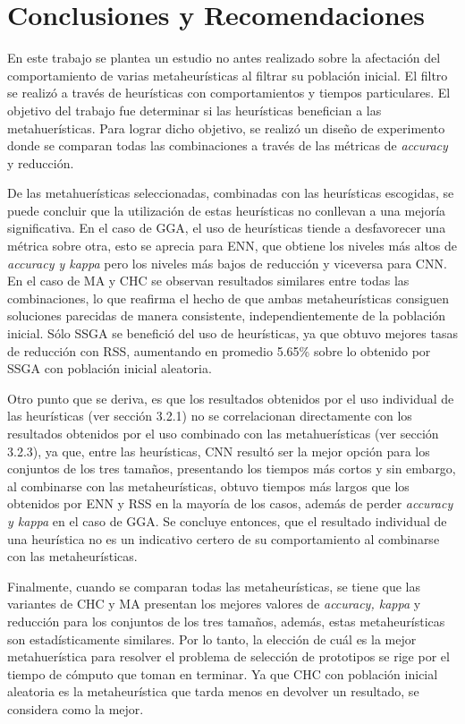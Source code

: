 \chapter*{Conclusiones y Recomendaciones}
\label{conclusiones}

En este trabajo se plantea un estudio no antes realizado sobre la afectación del comportamiento de varias metaheurísticas al filtrar su población inicial. El filtro se realizó a través de heurísticas con comportamientos y tiempos particulares. El objetivo del trabajo fue determinar si las heurísticas benefician a las metahuerísticas. Para lograr dicho objetivo, se realizó un diseño de experimento donde se comparan todas las combinaciones a través de las métricas de \emph{accuracy} y reducción.


De las metahuerísticas seleccionadas, combinadas con las heurísticas escogidas, se puede concluir que la utilización de estas heurísticas no conllevan a una mejoría significativa. En el caso de GGA, el uso de heurísticas tiende a desfavorecer una métrica sobre otra, esto se aprecia para ENN, que obtiene los niveles más altos de \emph{accuracy y kappa} pero los niveles más bajos de reducción y viceversa para CNN. En el caso de MA y CHC se observan resultados similares entre todas las combinaciones, lo que reafirma el hecho de que ambas metaheurísticas consiguen soluciones parecidas de manera consistente, independientemente de la población inicial. Sólo SSGA se benefició del uso de heurísticas, ya que obtuvo mejores tasas de reducción con RSS, aumentando en promedio 5.65\% sobre lo obtenido por SSGA con población inicial aleatoria.

Otro punto que se deriva, es que los resultados obtenidos por el uso individual de las heurísticas (ver sección 3.2.1) no se correlacionan directamente con los resultados obtenidos por el uso combinado con las metahuerísticas (ver sección 3.2.3), ya que, entre las heurísticas, CNN resultó ser la mejor opción para los conjuntos de los tres tamaños, presentando los tiempos más cortos y sin embargo, al combinarse con las metaheurísticas, obtuvo tiempos más largos que los obtenidos por ENN y RSS en la mayoría de los casos, además de perder \emph{accuracy y kappa} en el caso de GGA. Se concluye entonces, que el resultado individual de una heurística no es un indicativo certero de su comportamiento al combinarse con las metaheurísticas. 

Finalmente, cuando se comparan todas las metaheurísticas, se tiene que las variantes de CHC y MA presentan los mejores valores de \emph{accuracy, kappa} y reducción para los conjuntos de los tres tamaños, además, estas metaheurísticas son estadísticamente similares. Por lo tanto, la elección de cuál es la mejor metahuerística para resolver el problema de selección de prototipos se rige por el tiempo de cómputo que toman en terminar. Ya que CHC con población inicial aleatoria es la metaheurística que tarda menos en devolver un resultado, se considera como la mejor. 

